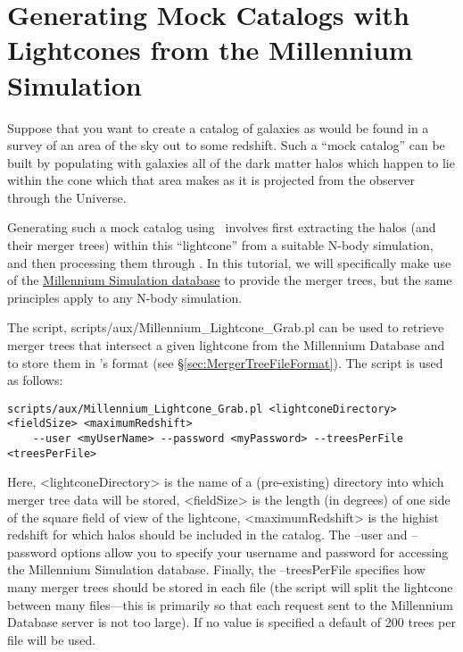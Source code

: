 \section{Generating Mock Catalogs with Lightcones from the Millennium Simulation}

Suppose that you want to create a catalog of galaxies as would be found in a survey of an area of the sky out to some redshift. Such a ``mock catalog'' can be built by populating with galaxies all of the dark matter halos which happen to lie within the cone which that area makes as it is projected from the observer through the Universe.

Generating such a mock catalog using \glc\ involves first extracting the halos (and their merger trees) within this ``lightcone'' from a suitable N-body simulation, and then processing them through \glc. In this tutorial, we will specifically make use of the \href{http://gavo.mpa-garching.mpg.de/MyMillennium3/MyDB}{Millennium Simulation database} to provide the merger trees, but the same principles apply to any N-body simulation.

The script, {\normalfont \ttfamily scripts/aux/Millennium\_Lightcone\_Grab.pl} can be used to retrieve merger trees that intersect a given lightcone from the Millennium Database and to store them in \glc's format (see \S\ref{sec:MergerTreeFileFormat}). The script is used as follows:
\begin{verbatim}
scripts/aux/Millennium_Lightcone_Grab.pl <lightconeDirectory> <fieldSize> <maximumRedshift>
    --user <myUserName> --password <myPassword> --treesPerFile <treesPerFile>
\end{verbatim}
Here, {\normalfont \ttfamily \textless lightconeDirectory\textgreater} is the name of a (pre-existing) directory into which merger tree data will be stored, {\normalfont \ttfamily \textless fieldSize\textgreater} is the length (in degrees) of one side of the square field of view of the lightcone, {\normalfont \ttfamily \textless maximumRedshift\textgreater} is the highist redshift for which halos should be included in the catalog. The {\normalfont \ttfamily --user} and {\normalfont \ttfamily --password} options allow you to specify your username and password for accessing the Millennium Simulation database. Finally, the {\normalfont \ttfamily --treesPerFile} specifies how many merger trees should be stored in each file (the script will split the lightcone between many files---this is primarily so that each request sent to the Millennium Database server is not too large). If no value is specified a default of 200 trees per file will be used.

